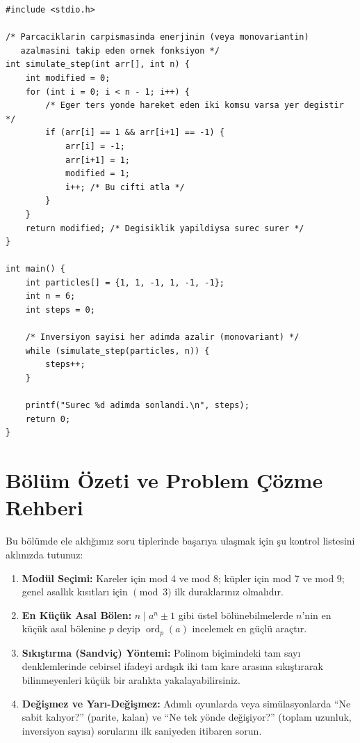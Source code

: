 \begin{lstlisting}[language=CTemel]
#include <stdio.h>

/* Parcaciklarin carpismasinda enerjinin (veya monovariantin)
   azalmasini takip eden ornek fonksiyon */
int simulate_step(int arr[], int n) {
    int modified = 0;
    for (int i = 0; i < n - 1; i++) {
        /* Eger ters yonde hareket eden iki komsu varsa yer degistir */
        if (arr[i] == 1 && arr[i+1] == -1) {
            arr[i] = -1;
            arr[i+1] = 1;
            modified = 1;
            i++; /* Bu cifti atla */
        }
    }
    return modified; /* Degisiklik yapildiysa surec surer */
}

int main() {
    int particles[] = {1, 1, -1, 1, -1, -1};
    int n = 6;
    int steps = 0;
    
    /* Inversiyon sayisi her adimda azalir (monovariant) */
    while (simulate_step(particles, n)) {
        steps++;
    }
    
    printf("Surec %d adimda sonlandi.\n", steps);
    return 0;
}
\end{lstlisting}

\section*{Bölüm Özeti ve Problem Çözme Rehberi}

Bu bölümde ele aldığımız soru tiplerinde başarıya ulaşmak için şu kontrol listesini aklınızda tutunuz:
\begin{enumerate}
    \item \textbf{Modül Seçimi:} Kareler için mod 4 ve mod 8; küpler için mod 7 ve mod 9; genel asallık kısıtları için $\pmod 3$ ilk duraklarınız olmalıdır.
    \item \textbf{En Küçük Asal Bölen:} $n \mid a^n \pm 1$ gibi üstel bölünebilmelerde $n$'nin en küçük asal bölenine $p$ deyip $\operatorname{ord}_p(a)$ incelemek en güçlü araçtır.
    \item \textbf{Sıkıştırma (Sandviç) Yöntemi:} Polinom biçimindeki tam sayı denklemlerinde cebirsel ifadeyi ardışık iki tam kare arasına sıkıştırarak bilinmeyenleri küçük bir aralıkta yakalayabilirsiniz.
    \item \textbf{Değişmez ve Yarı-Değişmez:} Adımlı oyunlarda veya simülasyonlarda ``Ne sabit kalıyor?'' (parite, kalan) ve ``Ne tek yönde değişiyor?'' (toplam uzunluk, inversiyon sayısı) sorularını ilk saniyeden itibaren sorun.
\end{enumerate}

